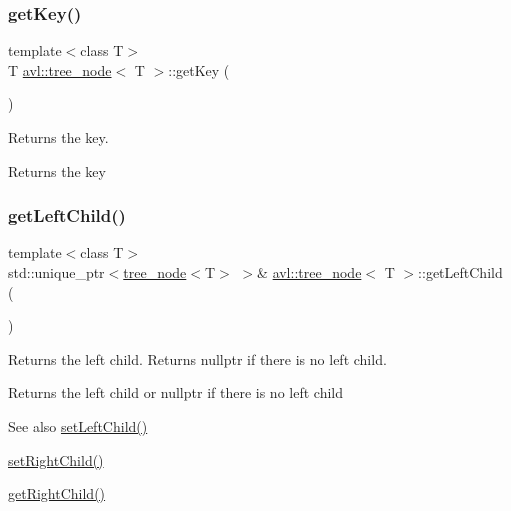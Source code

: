 \subsubsection{\texorpdfstring{get\+Key()}{getKey()}}
{\footnotesize\ttfamily template$<$class T$>$ \\
T \hyperlink{classavl_1_1tree__node}{avl\+::tree\+\_\+node}$<$ T $>$\+::get\+Key (\begin{DoxyParamCaption}{ }\end{DoxyParamCaption})\hspace{0.3cm}{\ttfamily [inline]}}

Returns the key. \begin{DoxyReturn}{Returns}
the key 
\end{DoxyReturn}
\mbox{\label{classavl_1_1tree__node_ad12a5f6a41cfc6203913c5b6bce30837}} 
\subsubsection{\texorpdfstring{get\+Left\+Child()}{getLeftChild()}}
{\footnotesize\ttfamily template$<$class T$>$ \\
std\+::unique\+\_\+ptr$<$\hyperlink{classavl_1_1tree__node}{tree\+\_\+node}$<$T$>$ $>$\& \hyperlink{classavl_1_1tree__node}{avl\+::tree\+\_\+node}$<$ T $>$\+::get\+Left\+Child (\begin{DoxyParamCaption}{ }\end{DoxyParamCaption})\hspace{0.3cm}{\ttfamily [inline]}}

Returns the left child. Returns nullptr if there is no left child. \begin{DoxyReturn}{Returns}
the left child or nullptr if there is no left child 
\end{DoxyReturn}
\begin{DoxySeeAlso}{See also}
\hyperlink{classavl_1_1tree__node_a21990bf288cf0ec0572e53afbacb9b35}{set\+Left\+Child()} 

\hyperlink{classavl_1_1tree__node_a09a51bcee333bbd509e3edb96179ae7e}{set\+Right\+Child()} 

\hyperlink{classavl_1_1tree__node_ac79592e64351573e622d0977002fc813}{get\+Right\+Child()} 
\end{DoxySeeAlso}
\mbox{\label{classavl_1_1tree__node_a47e9411fcd44d4ea5b8403e1ae757060}} 
